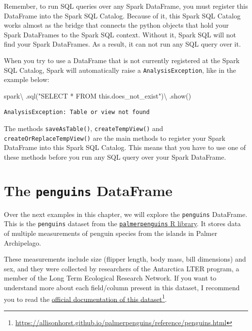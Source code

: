 \documentclass[
  11pt,
  letterpaper,
  DIV=11,
  numbers=noendperiod]{scrreprt}
\newenvironment{Shaded}{\begin{snugshade}}{\end{snugshade}}
\newcommand{\NormalTok}[1]{\textcolor[rgb]{0.00,0.23,0.31}{#1}}
\newcommand{\OperatorTok}[1]{\textcolor[rgb]{0.37,0.37,0.37}{#1}}
\newcommand{\StringTok}[1]{\textcolor[rgb]{0.13,0.47,0.30}{#1}}
\begin{document}
Remember, to run SQL queries over any Spark DataFrame, you must register
this DataFrame into the Spark SQL Catalog. Because of it, this Spark SQL
Catalog works almost as the bridge that connects the python objects that
hold your Spark DataFrames to the Spark SQL context. Without it, Spark
SQL will not find your Spark DataFrames. As a result, it can not run any
SQL query over it.

When you try to use a DataFrame that is not currently registered at the
Spark SQL Catalog, Spark will automatically raise a
\texttt{AnalysisException}, like in the example below:

\begin{Shaded}
\begin{Highlighting}[]
\NormalTok{spark}\OperatorTok{\textbackslash{}}
\NormalTok{  .sql(}\StringTok{"SELECT * FROM this.does\_not\_exist"}\NormalTok{)}\OperatorTok{\textbackslash{}}
\NormalTok{  .show()}
\end{Highlighting}
\end{Shaded}

\begin{verbatim}
AnalysisException: Table or view not found
\end{verbatim}

The methods \texttt{saveAsTable()}, \texttt{createTempView()} and
\texttt{createOrReplaceTempView()} are the main methods to register your
Spark DataFrame into this Spark SQL Catalog. This means that you have to
use one of these methods before you run any SQL query over your Spark
DataFrame.

\hypertarget{the-penguins-dataframe}{%
\section{\texorpdfstring{The \texttt{penguins}
DataFrame}{The penguins DataFrame}}\label{the-penguins-dataframe}}

Over the next examples in this chapter, we will explore the
\texttt{penguins} DataFrame. This is the \texttt{penguins} dataset from
the
\href{https://allisonhorst.github.io/palmerpenguins/}{\texttt{palmerpenguins}
R library}. It stores data of multiple measurements of penguin species
from the islands in Palmer Archipelago.

These measurements include size (flipper length, body mass, bill
dimensions) and sex, and they were collected by researchers of the
Antarctica LTER program, a member of the Long Term Ecological Research
Network. If you want to understand more about each field/column present
in this dataset, I recommend you to read the
\href{https://allisonhorst.github.io/palmerpenguins/reference/penguins.html}{official
documentation of this dataset}\footnote{\url{https://allisonhorst.github.io/palmerpenguins/reference/penguins.html}}.
\end{document}

